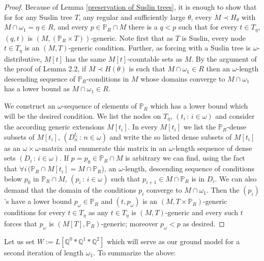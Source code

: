 \documentclass[a4paper,11pt]{article}
\newcommand{\forceP}{\mathbb{P}}
\newcommand{\forceQ}{\mathbb{Q}}
\begin{document}
\begin{proof}
Because of Lemma \ref{preservation of Suslin trees}, it is enough to show that for for any Suslin tree $T$, any regular and sufficiently large
 $\theta$, every $M \prec H_{\theta}$ with $M \cap \omega_1 = \eta \in R$, and every
 $p \in \forceP_R \cap M$ there is a $q<p$ such that for every
 $t \in T_{\eta}$, $(q,t)$ is $(M,(\forceP_R \times T))$-generic.
 Note first that as $T$ is Suslin, every node $t \in T_{\eta}$ is an
 $(M,T)$-generic condition. Further, as forcing with a Suslin tree
 is $\omega$-distributive, $M[t]$ has the same $M[t]$-countable sets as $M$.
 By the argument of the proof of Lemma 2.2, if $M\prec H(\theta)$ is such
 that $M \cap \omega_1 \in R$ then an $\omega$-length descending sequence
 of $\forceP_R$-conditions in $M$ whose domains converge to $M \cap \omega_1$
 has a lower bound as $M \cap \omega_1 \in R$.
 
 We construct an $\omega$-sequence of elements of $\forceP_R$ which has a lower bound
 which will be the desired condition. 
 We list the nodes on $T_{\eta}$, $(t_i \, : \, i \in \omega)$ and
 consider the according generic extensions $M[t_i]$.
 In every $M[t_i]$ we list the $\forceP_R$-dense subsets of $M[t_i]$,
 $(D^{t_i}_n \, : \, n \in \omega)$ and write 
 the so listed dense subsets of $M[t_i]$ as an $\omega \times \omega$-matrix and enumerate
 this matrix in an $\omega$-length sequence of dense sets $(D_i \, : \, i \in \omega)$.
 If $p=p_0 \in \forceP_R \cap M$ is arbitrary we can find, using the fact that $\forall i \, (\forceP_R \cap M[t_i] = M \cap \forceP_R$), an $\omega$-length, descending
 sequence of conditions below $p_0$ in $\forceP_R \cap M$, $(p_i \, : \, i \in \omega)$
 such that $p_{i+1} \in M \cap \forceP_R$ is in $D_i$.
 We can also demand that the domain of the conditions $p_i$ converge to $M \cap \omega_1$.
 Then the $(p_i)$'s have a lower bound $p_{\omega} \in \forceP_R$ and $(t, p_{\omega})$ is an
 $(M, T \times \forceP_R)$-generic conditions for every $t \in T_{\eta}$ as any $t \in T_{\eta}$ is $(M,T)$-generic
 and every such $t$ forces that $p_{\omega}$ is $(M[T], \forceP_R)$-generic; moreover $p_{\omega} < p$ as 
 desired.
 \end{proof}
 
Let us set $W:= L[\forceQ^0\ast \forceQ^1  \ast \forceQ^2 ]$ which will serve as our ground model for a second iteration of length $\omega_1$. To summarize the above:
\end{document}
